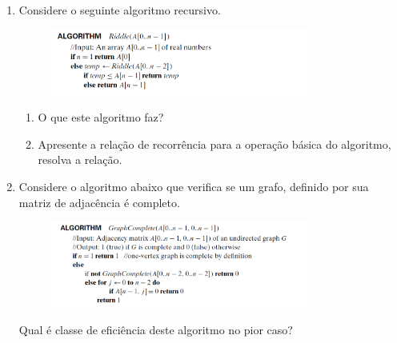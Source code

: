 \documentclass{article}
\begin{document}
\begin{enumerate}
    \item Considere o seguinte algoritmo recursivo.
    
    \begin{figure}[!ht]
        \centering
        \includegraphics[width=0.8\textwidth]{alg_a.PNG}
        \label{fig:alg_a}
    \end{figure}
    
    \begin{enumerate}
        \item O que este algoritmo faz?
        \item Apresente a relação de recorrência para a operação básica do algoritmo, resolva a relação.
    \end{enumerate}
    
    
    \item Considere o algoritmo abaixo que verifica se um grafo, definido por sua matriz de adjacência é completo. 
    
    \begin{figure}[!ht]
        \centering
        \includegraphics[width=0.8\textwidth]{alg_b.PNG}
        \label{fig:alg_b}
    \end{figure}
    
    Qual é classe de eficiência deste algoritmo no pior caso? 
\end{enumerate}

%
%
\end{document}

